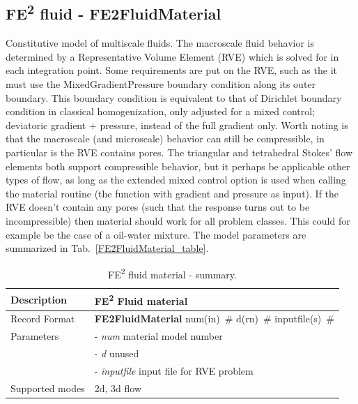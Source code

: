 \documentclass[a4paper]{article}
\newcommand{\descitem}[1]{{\noindent \bf #1}}
\newcommand{\elemparam}[2]{{{#1\tiny (#2)}~\#}}
\newcommand{\param}[1]{{\it #1}}
\begin{document}
\subsection{FE\textsuperscript{2} fluid - FE2FluidMaterial}
\label{FE2FluidMaterial}
Constitutive model of multiscale fluids.
The macroscale fluid behavior is determined by a Representative Volume Element (RVE) which is solved for in each integration point.
Some requirements are put on the RVE, such as the it must use the MixedGradientPressure boundary condition along its outer boundary. This boundary condition is equivalent to that of Dirichlet boundary condition in classical homogenization, only adjusted for a mixed control; deviatoric gradient + pressure, instead of the full gradient only.
Worth noting is that the macroscale (and microscale) behavior can still be compressible,  in particular is the RVE contains pores.
The triangular and tetrahedral Stokes' flow elements both support compressible behavior, but it perhaps be applicable other types of flow, as long as the extended mixed control option is used when calling the material routine (the function with gradient and pressure as input). If the RVE doesn't contain any pores (such that the response turns out to be incompressible) then material should work for all problem classes.
This could for example be the case of a oil-water mixture.
The model parameters are summarized in Tab.~\ref{FE2FluidMaterial_table}.

\begin{table}[!htb]
\centering
\begin{tabular}{|l|p{9cm}|}
\hline
Description & FE\textsuperscript{2} Fluid material\\
\hline
Record Format  & \descitem{FE2FluidMaterial} \elemparam{num}{in} \elemparam{d}{rn} \elemparam{inputfile}{s}\\
Parameters &- \param{num}       material model number\\
           &- \param{d}         unused\\
           &- \param{inputfile} input file for RVE problem\\
Supported modes&  2d, 3d flow\\
\hline
\end{tabular}
\caption{FE\textsuperscript{2} fluid material - summary.}
\label{NewtonianFluidMaterial_table}
\end{table}

\clearpage
\end{document}
